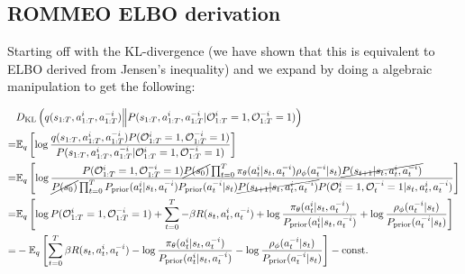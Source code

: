 \subsection{ROMMEO ELBO derivation}
\label{appx:chap3-ROMMEO-ELBO}
Starting off with the KL-divergence (we have shown that this is equivalent to ELBO derived from Jensen's inequality) and we expand by doing a algebraic manipulation to get the following:

\begin{equation*}
    \begin{aligned}
        &D_{\mathrm{KL}}\left( q(s_{1:T}, a_{1:T}^i, a^{-i}_{1:T}) \Big\| P(s_{1:T}, a^i_{1:T}, a^{-i}_{1:T}|\mathcal{O}^i_{1:T} = 1,  \mathcal{O}^{-i}_{1:T} = 1)  \right) \\
        =& \mathbb{E}_{q}\left[ \log \frac{q(s_{1:T}, a_{1:T}^i, a^{-i}_{1:T}) P(\mathcal{O}^i_{1:T} = 1,  \mathcal{O}^{-i}_{1:T} = 1)}{P(s_{1:T}, a^i_{1:T}, a^{-i}_{1:T} | \mathcal{O}^i_{1:T} = 1, \mathcal{O}^{-i}_{1:T} = 1)} \right] \\
        =& \mathbb{E}_{q}\left[ \log \frac{P(\mathcal{O}^i_{1:T} = 1, \mathcal{O}^{-i}_{1:T} = 1)\cancel{P(s_0)} \prod^T_{t=0} \pi_{\theta}(a^i_t | s_t, a^{-i}_t) \rho_{\phi}(a^{-i}_t | s_t) \cancel{P(s_{t+1} | s_t, a^i_t, a^{-i}_t)}}{\cancel{P(s_0)} \prod^T_{t=0} P_{\text{prior}}(a^i_t | s_t, a^{-i}_t) P_{\text{prior}}(a^{-i}_t | s_t) \cancel{P(s_{t+1} | s_t, a^i_t, a^{-i}_t)} P(\mathcal{O}^i_t = 1, \mathcal{O}^{-i}_t = 1  | s_t, a^i_t, a^{-i}_t)}  \right] \\
        =& \mathbb{E}_{q}\left[  \log P(\mathcal{O}^i_{1:T} = 1, \mathcal{O}^{-i}_{1:T} = 1) + \sum^T_{t=0} - \beta R(s_t, a^i_t, a^{-i}_t)  + \log \frac{\pi_{\theta}(a^i_t | s_t, a^{-i}_t)}{P_{\text{prior}}(a^i_t | s_t, a^{-i}_t) } + \log \frac{\rho_{\phi}(a^{-i}_t | s_t)}{P_{\text{prior}}(a^{-i}_t | s_t)} \right] \\
        =& - \mathbb{E}_{q}\left[  \sum^T_{t=0} \beta R(s_t, a^i_t, a^{-i}_t)  - \log \frac{\pi_{\theta}(a^i_t | s_t, a^{-i}_t)}{P_{\text{prior}}(a^i_t | s_t, a^{-i}_t) } - \log \frac{\rho_{\phi}(a^{-i}_t | s_t)}{P_{\text{prior}}(a^{-i}_t | s_t)} \right] - \text{const.} \\
    \end{aligned}
\end{equation*}

